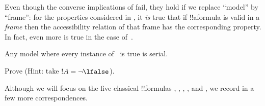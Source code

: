 \documentclass[../../../include/open-logic-section]{subfiles}
\begin{document}


Even though the converse implications of 
fail, they hold if we replace ``model'' by ``frame'': for the
properties considered in , it \emph{is} true
that if !!a{formula} is valid in a \emph{frame} then the accessibility
relation of that frame has the corresponding property. In fact, even
more is true in the case of~.

\begin{ex}
  Any model where every instance of~ is true is serial.
\end{ex}

\begin{prob}
  Prove  (Hint:
  take $!A = \lnot\lfalse$).
\end{prob}

Although we will focus on the five classical !!{formula}s , ,
, , and , we record in  a few
more correspondences.
\end{document}
